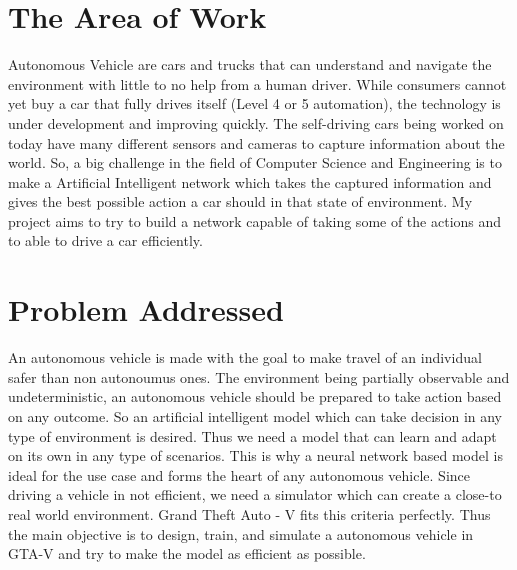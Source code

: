 \section{The Area of Work}
Autonomous Vehicle are cars and trucks that can understand and navigate the environment with little to no help from a human driver. While consumers cannot yet buy a car that fully drives itself (Level 4 or 5 automation)\cite{J3016_202104}, the technology is under development and improving quickly. The self-driving cars being worked on today have many different sensors and cameras to capture information about the world. So, a big challenge in the field of Computer Science and Engineering is to make a Artificial Intelligent network which takes the captured information and gives the best possible action a car should in that state of environment. My project aims to try to build a network capable of taking some of the actions and to able to drive a car efficiently.

\section{Problem Addressed}
An autonomous vehicle is made with the goal to make travel of an individual safer than non autonoumus ones. The environment being partially observable and undeterministic, an autonomous vehicle should be prepared to take action based on any outcome. So an artificial intelligent model which can take decision in any type of environment is desired. Thus we need a model that can learn and adapt on its own in any type of scenarios. This is why a neural network based model is ideal for the use case and forms the heart of any autonomous vehicle. Since driving a vehicle in not efficient, we need a simulator which can create a close-to real world environment. Grand Theft Auto - V fits this criteria perfectly. Thus the main objective is to design, train, and simulate a autonomous vehicle in GTA-V and try to make the model as efficient as possible.

